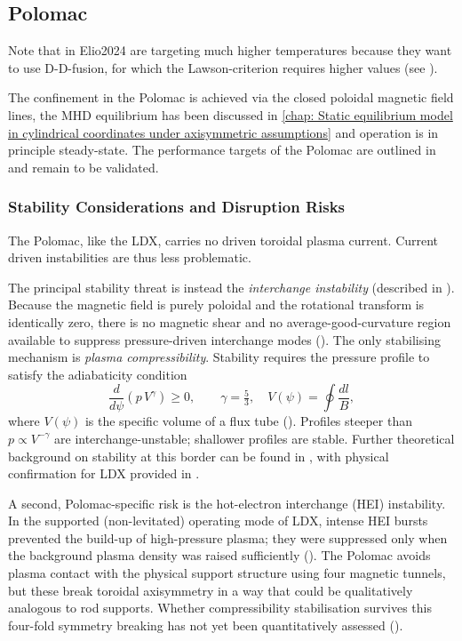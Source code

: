 \subsection{Polomac}
Note that \citeauthor{Elio2024} in {Elio2024} are targeting much higher temperatures 
because they want to use D-D-fusion, for which the Lawson-criterion requires higher values (see \cite{Elio2024}).

The confinement in the Polomac is achieved via the closed poloidal magnetic field lines,
the MHD equilibrium has been discussed in \autoref{chap: Static equilibrium model in cylindrical coordinates under axisymmetric assumptions}
and operation is in principle steady-state.
The performance targets of the Polomac are outlined in \cite{Elio2024} and remain to be validated.


\subsubsection{Stability Considerations and Disruption Risks}

The Polomac, like the LDX,
carries no driven toroidal plasma current. Current driven instabilities are thus
less problematic.

The principal stability threat is instead the \emph{interchange
instability} (described in \cite{Rosenbluth1957}). Because the magnetic field is
purely poloidal and the rotational transform is identically zero,
there is no magnetic shear and no average-good-curvature region
available to suppress pressure-driven interchange modes
(\cite[§\,8.11.3]{Freidberg2014}). The only stabilising mechanism is
\emph{plasma compressibility}. Stability requires the
pressure profile to satisfy the adiabaticity condition
\begin{equation}
    \frac{d}{d\psi}\!\left(p\,V^\gamma\right) \geq 0,
    \qquad \gamma = \tfrac{5}{3},
    \quad V(\psi) = \oint \frac{dl}{B},
\end{equation}
where $V(\psi)$ is the specific volume of a flux tube
(\cite{Rosenbluth1957,Garnier1999}). Profiles steeper than
$p \propto V^{-\gamma}$ are interchange-unstable; shallower profiles
are stable. Further theoretical background on stability at this border
can be found in \cite{Garnier1999}, with physical confirmation for 
LDX provided in \cite{Garnier2006}.

A second, Polomac-specific risk is the hot-electron interchange (HEI) instability.
In the supported (non-levitated) operating mode
of LDX, intense HEI bursts prevented the build-up of high-pressure
plasma; they were suppressed only when the background plasma density
was raised sufficiently (\cite{Garnier2006}). The Polomac avoids
plasma contact with the physical support structure using four magnetic tunnels,
but these break
toroidal axisymmetry in a way that could be qualitatively analogous to
rod supports. Whether compressibility stabilisation survives this
four-fold symmetry breaking has not yet been quantitatively
assessed (\cite{Elio2024}).
